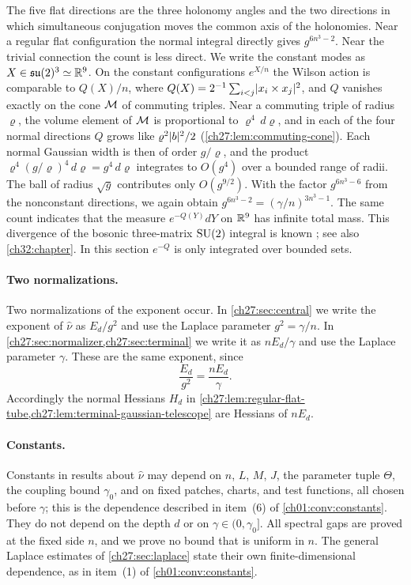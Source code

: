 The five flat directions are the three holonomy angles and the two directions in which simultaneous conjugation moves the common axis of the holonomies. Near a regular flat configuration the normal integral directly gives $g^{6n^3-2}$. Near the trivial connection the count is less direct. We write the constant modes as $X\in\mathfrak{su}(2)^3\simeq\mathbb R^9$. On the constant configurations $e^{X/n}$ the Wilson action is comparable to $Q(X)/n$, where $Q(X)=2^{-1}\sum_{i<j}\lvert x_i\times x_j\rvert^2$, and $Q$ vanishes exactly on the cone $\mathcal M$ of commuting triples. Near a commuting triple of radius $\varrho$, the volume element of $\mathcal M$ is proportional to $\varrho^4\,d\varrho$, and in each of the four normal directions $Q$ grows like $\varrho^2\lvert b\rvert^2/2$ (\cref{ch27:lem:commuting-cone}). Each normal Gaussian width is then of order $g/\varrho$, and the product $\varrho^4(g/\varrho)^4\,d\varrho=g^4\,d\varrho$ integrates to $O(g^4)$ over a bounded range of radii. The ball of radius $\sqrt g$ contributes only $O(g^{9/2})$. With the factor $g^{6n^3-6}$ from the nonconstant directions, we again obtain $g^{6n^3-2}=(\gamma/n)^{3n^3-1}$. The same count indicates that the measure $e^{-Q(Y)}dY$ on $\mathbb R^9$ has infinite total mass. This divergence of the bosonic three-matrix $\mathrm{SU}(2)$ integral is known \cite{KrauthNicolaiStaudacher1998,KrauthStaudacher1998FiniteIntegrals,AustingWheater2001Convergence}; see also \cref{ch32:chapter}. In this section $e^{-Q}$ is only integrated over bounded sets.

\paragraph{Two normalizations.}
Two normalizations of the exponent occur. In \cref{ch27:sec:central} we write the exponent of $\widehat\nu$ as $E_d/g^2$ and use the Laplace parameter $g^2=\gamma/n$. In \cref{ch27:sec:normalizer,ch27:sec:terminal} we write it as $nE_d/\gamma$ and use the Laplace parameter $\gamma$. These are the same exponent, since
\[
 \frac{E_d}{g^2}=\frac{nE_d}{\gamma}.
\]
Accordingly the normal Hessians $H_d$ in \cref{ch27:lem:regular-flat-tube,ch27:lem:terminal-gaussian-telescope} are Hessians of $nE_d$.

\paragraph{Constants.}
Constants in results about $\widehat\nu$ may depend on $n$, $L$, $M$, $J$, the parameter tuple $\Theta$, the coupling bound $\gamma_0$, and on fixed patches, charts, and test functions, all chosen before $\gamma$; this is the dependence described in item~(6) of \cref{ch01:conv:constants}. They do not depend on the depth $d$ or on $\gamma\in(0,\gamma_0]$. All spectral gaps are proved at the fixed side $n$, and we prove no bound that is uniform in $n$. The general Laplace estimates of \cref{ch27:sec:laplace} state their own finite-dimensional dependence, as in item~(1) of \cref{ch01:conv:constants}.

